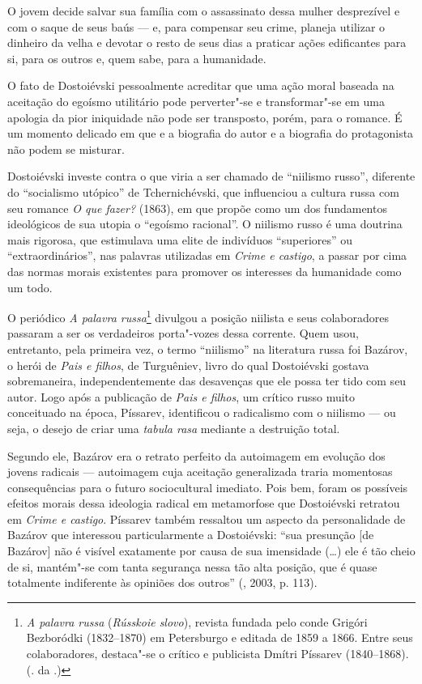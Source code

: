O jovem decide salvar sua família com o assassinato dessa mulher
desprezível e com o saque de seus baús --- e, para compensar seu crime,
planeja utilizar o dinheiro da velha e devotar o resto de seus dias a
praticar ações edificantes para si, para os outros e, quem sabe, para a
humanidade.

O fato de Dostoiévski pessoalmente acreditar que uma ação moral baseada
na aceitação do egoísmo utilitário pode perverter"-se e transformar"-se em
uma apologia da pior iniquidade não pode ser transposto, porém, para o
romance. É um momento delicado em que e a biografia do autor e a
biografia do protagonista não podem se misturar.

Dostoiévski investe contra o que viria a ser chamado de ``niilismo
russo'', diferente do ``socialismo utópico'' de Tchernichévski, que
influenciou a cultura russa com seu romance \emph{O que fazer?} (1863),
em que propõe como um dos fundamentos ideológicos de sua utopia o
``egoísmo racional''. O niilismo russo é uma doutrina mais rigorosa, que
estimulava uma elite de indivíduos ``superiores'' ou
``extraordinários'', nas palavras utilizadas em \emph{Crime e castigo},
a passar por cima das normas morais existentes para promover os
interesses da humanidade como um todo.

O periódico \emph{A palavra russa}\footnote{\emph{A palavra russa}
  (\emph{Rússkoie slovo}), revista fundada pelo conde Grigóri Bezboródki
  (1832--1870) em Petersburgo e editada de 1859 a 1866. Entre seus
  colaboradores, destaca"-se o crítico e publicista Dmítri Píssarev
  (1840--1868). (. da .)} divulgou a posição niilista e seus
colaboradores passaram a ser os verdadeiros porta"-vozes dessa corrente.
Quem usou, entretanto, pela primeira vez, o termo ``niilismo'' na
literatura russa foi Bazárov, o herói de \emph{Pais e filhos}, de
Turguêniev, livro do qual Dostoiévski gostava sobremaneira,
independentemente das desavenças que ele possa ter tido com seu autor.
Logo após a publicação de \emph{Pais e filhos}, um crítico russo muito
conceituado na época, Píssarev, identificou o radicalismo com o niilismo
--- ou seja, o desejo de criar uma \emph{tabula rasa} mediante a
destruição total.

Segundo ele, Bazárov era o retrato perfeito da autoimagem em evolução
dos jovens radicais --- autoimagem cuja aceitação generalizada traria
momentosas consequências para o futuro sociocultural imediato. Pois bem,
foram os possíveis efeitos morais dessa ideologia radical em metamorfose
que Dostoiévski retratou em \emph{Crime e castigo}. Píssarev também
ressaltou um aspecto da personalidade de Bazárov que interessou
particularmente a Dostoiévski: ``sua presunção [de Bazárov] não é
visível exatamente por causa de sua imensidade (\ldots{}) ele é tão cheio de
si, mantém"-se com tanta segurança nessa tão alta posição, que é quase
totalmente indiferente às opiniões dos outros'' (, 2003, p. 113).

